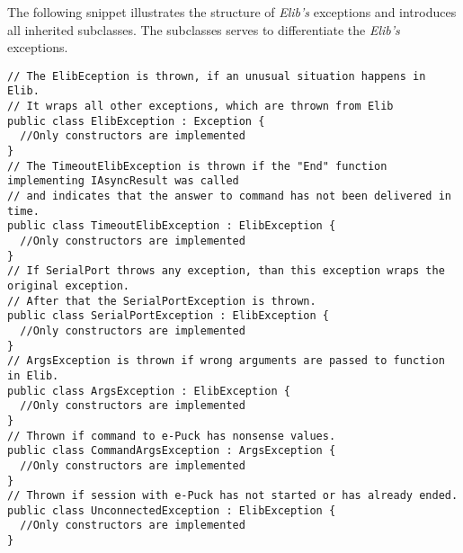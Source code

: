   The following snippet illustrates the structure of {\it Elib's} exceptions and
  introduces all inherited subclasses.
  The subclasses serves to differentiate the {\it Elib's} exceptions.
\begin{lstlisting}
// The ElibEception is thrown, if an unusual situation happens in Elib.
// It wraps all other exceptions, which are thrown from Elib
public class ElibException : Exception { 
  //Only constructors are implemented
}
// The TimeoutElibException is thrown if the "End" function implementing IAsyncResult was called 
// and indicates that the answer to command has not been delivered in time.
public class TimeoutElibException : ElibException { 
  //Only constructors are implemented
}
// If SerialPort throws any exception, than this exception wraps the original exception.
// After that the SerialPortException is thrown.
public class SerialPortException : ElibException {
  //Only constructors are implemented
}
// ArgsException is thrown if wrong arguments are passed to function in Elib.
public class ArgsException : ElibException {
  //Only constructors are implemented
}
// Thrown if command to e-Puck has nonsense values.
public class CommandArgsException : ArgsException {
  //Only constructors are implemented
}
// Thrown if session with e-Puck has not started or has already ended.
public class UnconnectedException : ElibException {
  //Only constructors are implemented
}

\end{lstlisting}
